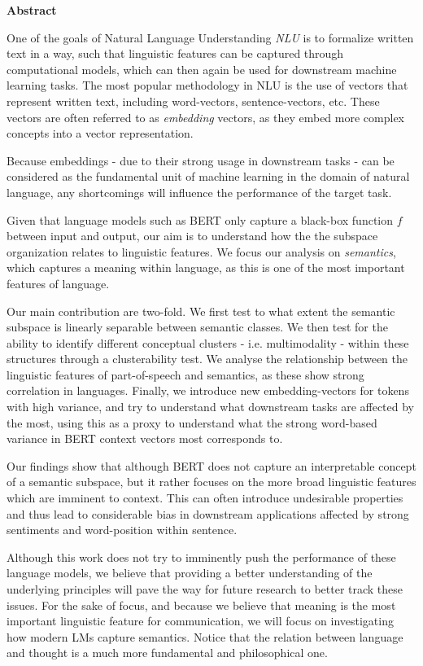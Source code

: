 \newpage
{\Huge \bf Abstract}
\vspace{24pt} 

One of the goals of Natural Language Understanding \textit{NLU} is to formalize written text in a way, such that linguistic features can be captured through computational models, which can then again be used for downstream machine learning tasks.
The most popular methodology in NLU is the use of vectors that represent written text, including word-vectors, sentence-vectors, etc. 
These vectors are often referred to as \textit{embedding} vectors, as they embed more complex concepts into a vector representation.

Because embeddings - due to their strong usage in downstream tasks - can be considered as the fundamental unit of machine learning in the domain of natural language, any shortcomings will influence the performance of the target task.

Given that language models such as BERT only capture a black-box function $f$ between input and output, our aim is to understand how the the subspace organization relates to linguistic features.
We focus our analysis on \textit{semantics}, which captures a meaning within language, as this is one of the most important features of language.

Our main contribution are two-fold. 
We first test to what extent the semantic subspace is linearly separable between semantic classes.
We then test for the ability to identify different conceptual clusters - i.e. multimodality -  within these structures through a clusterability test.
We analyse the relationship between the linguistic features of part-of-speech and semantics, as these show strong correlation in languages.
Finally, we introduce new embedding-vectors for tokens with high variance, and try to understand what downstream tasks are affected by the most, using this as a proxy to understand what the strong word-based variance in BERT context vectors most corresponds to.

Our findings show that although BERT does not capture an interpretable concept of a semantic subspace, but it rather focuses on the more broad linguistic features which are imminent to context.
This can often introduce undesirable properties and thus lead to considerable bias in downstream applications affected by strong sentiments and word-position within sentence.


Although this work does not try to imminently push the performance of these language models, we believe that providing a better understanding of the underlying principles will pave the way for future research to better track these issues.
For the sake of focus, and because we believe that meaning is the most important linguistic feature for communication, we will focus on investigating how modern LMs capture semantics. 
Notice that the relation between language and thought is a much more fundamental and philosophical one.


